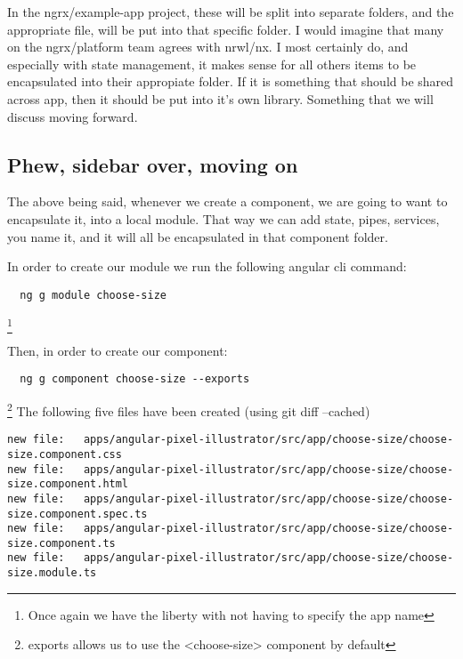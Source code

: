In the ngrx/example-app project, these will be split into separate folders, and
the appropriate file, will be put into that specific folder. I would imagine
that many on the ngrx/platform team agrees with nrwl/nx. I most certainly do,
and especially with state management, it makes sense for all others items to
be encapsulated into their appropiate folder. If it is something that should be
shared across app, then it should be put into it's own library. Something that
we will discuss moving forward.

\subsection {Phew, sidebar over, moving on}

The above being said, whenever we create a component, we are going to want to
encapsulate it, into a local module. That way we can add state, pipes, services,
you name it, and it will all be encapsulated in that component folder.

In order to create our module we run the following angular cli command:

\begin{verbatim}
  ng g module choose-size
\end{verbatim} \footnote{Once again we have the liberty with not having to
specify the app name}

Then, in order to create our component:
\begin{verbatim}
  ng g component choose-size --exports
\end{verbatim}
\footnote{exports allows us to use the <choose-size> component by default}
The following five files have been created (using git diff --cached)
\begin{lstlisting}[breaklines]
new file:   apps/angular-pixel-illustrator/src/app/choose-size/choose-size.component.css
new file:   apps/angular-pixel-illustrator/src/app/choose-size/choose-size.component.html
new file:   apps/angular-pixel-illustrator/src/app/choose-size/choose-size.component.spec.ts
new file:   apps/angular-pixel-illustrator/src/app/choose-size/choose-size.component.ts
new file:   apps/angular-pixel-illustrator/src/app/choose-size/choose-size.module.ts
\end{lstlisting}
